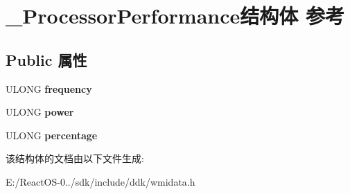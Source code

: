 \hypertarget{struct___processor_performance}{}\section{\+\_\+\+Processor\+Performance结构体 参考}
\label{struct___processor_performance}
\subsection*{Public 属性}
\begin{DoxyCompactItemize}
\item 
\mbox{\label{struct___processor_performance_a4f7ed0bf7c6699776ce3c910c0bfecf0}} 
U\+L\+O\+NG {\bfseries frequency}
\item 
\mbox{\label{struct___processor_performance_a9bb3ce246c4e76296117627bb3aa1bf6}} 
U\+L\+O\+NG {\bfseries power}
\item 
\mbox{\label{struct___processor_performance_a0013d4d5965c62e16f61945bb582302e}} 
U\+L\+O\+NG {\bfseries percentage}
\end{DoxyCompactItemize}


该结构体的文档由以下文件生成\+:\begin{DoxyCompactItemize}
\item 
E\+:/\+React\+O\+S-\/0../sdk/include/ddk/wmidata.\+h\end{DoxyCompactItemize}

